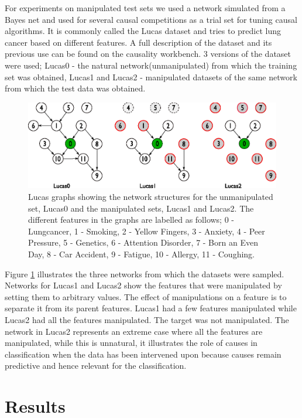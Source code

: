 \documentclass{esannV2}
\begin{document}
For experiments on manipulated test sets we used a network simulated from a Bayes net and used for several causal competitions as a trial set for tuning causal algorithms. It is commonly called the Lucas dataset\cite{12} and tries to predict lung cancer based on different features. A full description of the dataset and its previous use can be found on the causality workbench\cite{13}. 3 versions of the dataset were used; Lucas0 - the natural network(unmanipulated) from which the training set was obtained, Lucas1 and Lucas2 - manipulated datasets of the same network from which the test data was obtained.

\begin{figure}[!h]
	\centering
		\includegraphics[width=1.0\textwidth]{lucasgraph.eps}
	\caption{\footnotesize{Lucas graphs showing the network structures for the unmanipulated set, Lucas0 and the manipulated sets, Lucas1 and Lucas2. The different features in the graphs are labelled as follows; 0 - Lungcancer, 1 - Smoking, 2 - Yellow Fingers, 3 - Anxiety, 4 - Peer Pressure, 5 - Genetics, 6 - Attention Disorder, 7 - Born an Even Day, 8 - Car Accident, 9 - Fatigue, 10 - Allergy, 11 - Coughing.}}
	\label{fig:lucasgraph}
\end{figure}

Figure \ref{fig:lucasgraph} illustrates the three networks from which the datasets were sampled. Networks for Lucas1 and Lucas2 show the features that were manipulated by setting them to arbitrary values. The effect of manipulations on a feature is to separate it from its parent features. Lucas1 had a few features manipulated while Lucas2 had all the features manipulated. The target was not manipulated. The network in Lucas2 represents an extreme case where all the features are manipulated, while this is unnatural, it illustrates the role of causes in classification when the data has been intervened upon because causes remain predictive and hence relevant for the classification.

\section{Results}
\label{sec:Results}
\end{document}
